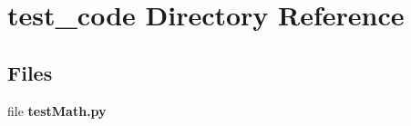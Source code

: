 \section{test\+\_\+code Directory Reference}
\label{dir_c5c299569ede35187292ca4fb0972402}
\subsection*{Files}
\begin{DoxyCompactItemize}
\item 
file \textbf{ test\+Math.\+py}
\end{DoxyCompactItemize}
